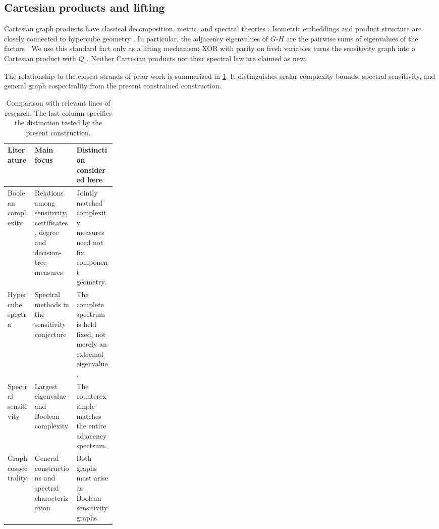 \documentclass[twoside,12pt,letterpaper]{article}
\theoremstyle{definition}
\begin{document}
\subsection{Cartesian products and lifting}
Cartesian graph products have classical decomposition, metric, and spectral theories \parencite{sabidussi1960,imrich1994,imrich2000,klavzar2002,imrich2008,hammack2011}. Isometric embeddings and product structure are closely connected to hypercube geometry \parencite{graham1985}. In particular, the adjacency eigenvalues of $G\square H$ are the pairwise sums of eigenvalues of the factors \parencite{imrich2008,hammack2011}. We use this standard fact only as a lifting mechanism: XOR with parity on fresh variables turns the sensitivity graph into a Cartesian product with $Q_r$. Neither Cartesian products nor their spectral law are claimed as new.

The relationship to the closest strands of prior work is summarized in \cref{tab:priorwork}. It distinguishes scalar complexity bounds, spectral sensitivity, and general graph cospectrality from the present constrained construction.

\begin{table}[H]
\centering
\caption{Comparison with relevant lines of research. The last column specifies the distinction tested by the present construction.}
\label{tab:priorwork}
\small
\setlength{\tabcolsep}{5pt}
\renewcommand{\arraystretch}{1.18}
\begin{tabularx}{\linewidth}{>{\RaggedRight\arraybackslash}p{0.25\linewidth}>{\RaggedRight\arraybackslash}X>{\RaggedRight\arraybackslash}X}
\toprule
Literature & Main focus & Distinction considered here\\
\midrule
Boolean complexity \parencite{nisan1991,nisan1994,buhrman2002} &
Relations among sensitivity, certificates, degree and decision-tree measures &
Jointly matched complexity measures need not fix component geometry.\\
Hypercube spectra \parencite{huang2019} &
Spectral methods in the sensitivity conjecture &
The complete spectrum is held fixed, not merely an extremal eigenvalue.\\
Spectral sensitivity \parencite{aaronson2021,prusis2025,meiburg2026} &
Largest eigenvalue and Boolean complexity &
The counterexample matches the entire adjacency spectrum.\\
Graph cospectrality \parencite{godsil1982,vandam2003,vandam2009} &
General constructions and spectral characterization &
Both graphs must arise as Boolean sensitivity graphs.\\
\bottomrule
\end{tabularx}
\end{table}
\end{document}
